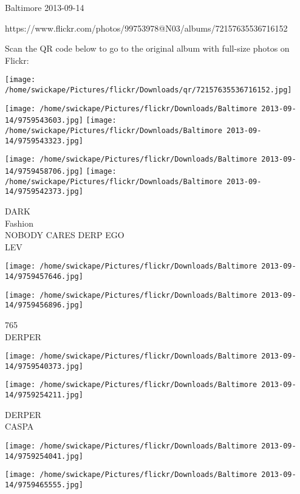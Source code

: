 \documentclass[10pt,letterpaper]{article}
\begin{document}
Baltimore 2013-09-14

https://www.flickr.com/photos/99753978@N03/albums/72157635536716152

Scan the QR code below to go to the original album with full-size photos on Flickr:

\texttt{[image: /home/swickape/Pictures/flickr/Downloads/qr/72157635536716152.jpg]}
\pagebreak

\texttt{[image: /home/swickape/Pictures/flickr/Downloads/Baltimore 2013-09-14/9759543603.jpg]}
\texttt{[image: /home/swickape/Pictures/flickr/Downloads/Baltimore 2013-09-14/9759543323.jpg]}

\texttt{[image: /home/swickape/Pictures/flickr/Downloads/Baltimore 2013-09-14/9759458706.jpg]}
\texttt{[image: /home/swickape/Pictures/flickr/Downloads/Baltimore 2013-09-14/9759542373.jpg]}

DARK\\
Fashion\\
NOBODY CARES DERP EGO\\
LEV\\
\pagebreak

\texttt{[image: /home/swickape/Pictures/flickr/Downloads/Baltimore 2013-09-14/9759457646.jpg]}

\vspace{0.25in}
\texttt{[image: /home/swickape/Pictures/flickr/Downloads/Baltimore 2013-09-14/9759456896.jpg]}

765\\
DERPER\\
\pagebreak

\texttt{[image: /home/swickape/Pictures/flickr/Downloads/Baltimore 2013-09-14/9759540373.jpg]}

\vspace{0.25in}
\texttt{[image: /home/swickape/Pictures/flickr/Downloads/Baltimore 2013-09-14/9759254211.jpg]}

DERPER\\
CASPA\\
\pagebreak

\texttt{[image: /home/swickape/Pictures/flickr/Downloads/Baltimore 2013-09-14/9759254041.jpg]}

\vspace{0.25in}
\texttt{[image: /home/swickape/Pictures/flickr/Downloads/Baltimore 2013-09-14/9759465555.jpg]}
\end{document}
